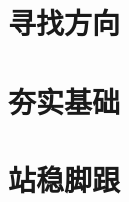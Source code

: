 \documentclass{si_template/cn_note}
\begin{document}
\frontmatter
\mainmatter
\chapter{寻找方向}\label{chap:find_direction}

\chapter{夯实基础}\label{chap:build_basic}

\chapter{站稳脚跟}\label{chap:stand_up}


\backmatter
\end{document}
